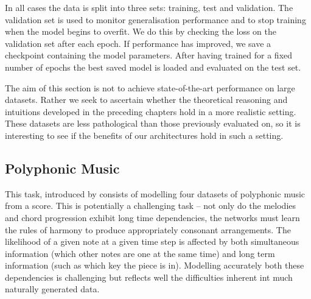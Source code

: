 In all cases the data is split into three sets: training, test and validation.
The validation set is used to monitor generalisation performance and to stop
training when the model begins to overfit. We do this by checking the loss on
the validation set after each epoch. If performance has improved,
we save a checkpoint containing the model parameters. After having trained for
a fixed number of epochs the best saved model is loaded and
evaluated on the test set.

The aim of this section is not to achieve state-of-the-art performance on
large datasets. Rather we seek to ascertain whether the
theoretical reasoning and intuitions developed in the preceding chapters hold
in a more realistic setting. These datasets are less pathological than
those previously evaluated on, so it is interesting to see if the benefits
of our architectures hold in such a setting.

\subsection{Polyphonic Music}
This task, introduced by 
\autocite{Boulanger-Lewandowski2012} consists of modelling four datasets of
polyphonic music from a score. This is potentially a challenging task -- not
only do the melodies and chord progression exhibit long time dependencies, the
networks must learn the rules of harmony to produce appropriately consonant
arrangements. The likelihood of a given note at a given time step is affected
by both simultaneous information (which other notes are one at the same time)
and long term information (such as which key the piece is in). Modelling accurately
both these dependencies is challenging but reflects well the difficulties inherent
int much naturally generated data.



